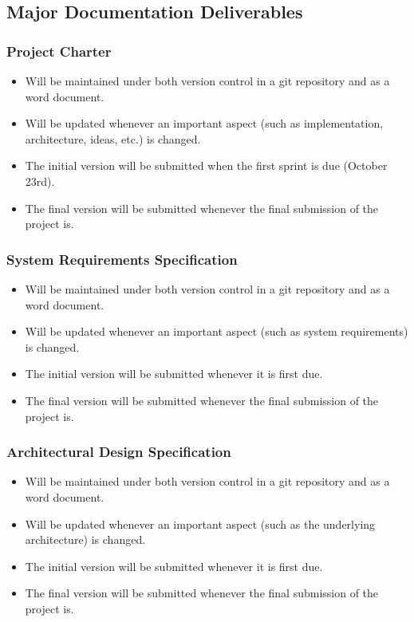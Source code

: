 
\subsection{Major Documentation Deliverables}

\subsubsection{Project Charter}
\begin{itemize}
  \item Will be maintained under both version control in a git repository and as a word document.
  \item Will be updated whenever an important aspect (such as implementation, architecture, ideas, etc.) is changed.
  \item The initial version will be submitted when the first sprint is due (October 23rd).
  \item The final version will be submitted whenever the final submission of the project is.
\end{itemize}

\subsubsection{System Requirements Specification}
\begin{itemize}
  \item Will be maintained under both version control in a git repository and as a word document.
  \item Will be updated whenever an important aspect (such as system requirements) is changed.
  \item The initial version will be submitted whenever it is first due.
  \item The final version will be submitted whenever the final submission of the project is.
\end{itemize}

\subsubsection{Architectural Design Specification}
\begin{itemize}
  \item Will be maintained under both version control in a git repository and as a word document.
  \item Will be updated whenever an important aspect (such as the underlying architecture) is changed.
  \item The initial version will be submitted whenever it is first due.
  \item The final version will be submitted whenever the final submission of the project is.
\end{itemize}

